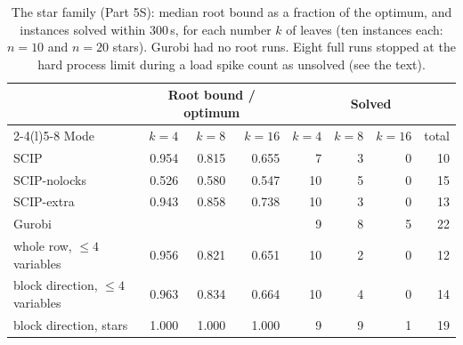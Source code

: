 \begin{table}[t]
\centering\footnotesize
\caption{The star family (Part 5S): median root bound as a fraction of the
optimum, and instances solved within 300\,s, for each number $k$ of leaves (ten
instances each: $n=10$ and $n=20$ stars). Gurobi had no root runs. Eight full
runs stopped at the hard process limit during a load spike count as unsolved
(see the text).}\label{tab:stars}
\begin{tabular}{@{}lrrrrrrr@{}}
\toprule
& \multicolumn{3}{c}{Root bound / optimum} & \multicolumn{4}{c}{Solved}\\
\cmidrule(lr){2-4}\cmidrule(l){5-8}
Mode & $k=4$ & $k=8$ & $k=16$ & $k=4$ & $k=8$ & $k=16$ & total\\
\midrule
SCIP & 0.954 & 0.815 & 0.655 & 7 & 3 & 0 & 10\\
SCIP-nolocks & 0.526 & 0.580 & 0.547 & 10 & 5 & 0 & 15\\
SCIP-extra & 0.943 & 0.858 & 0.738 & 10 & 3 & 0 & 13\\
Gurobi & & & & 9 & 8 & 5 & 22\\
whole row, $\le4$ variables & 0.956 & 0.821 & 0.651 & 10 & 2 & 0 & 12\\
block direction, $\le4$ variables & 0.963 & 0.834 & 0.664 & 10 & 4 & 0 & 14\\
block direction, stars & 1.000 & 1.000 & 1.000 & 9 & 9 & 1 & 19\\
\bottomrule
\end{tabular}
\end{table}

